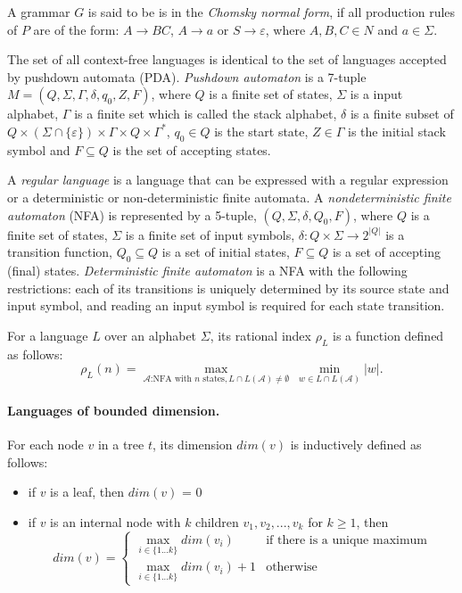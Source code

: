 \documentclass[11pt,a4paper]{article} %
\begin{document}
A grammar $G$ is said to be is in the \textit{Chomsky normal form}, if all production rules of $P$ are of the form:
$A \rightarrow BC$, $A \rightarrow a$ or $S \rightarrow \varepsilon$, where $A, B, C \in N$ and $a \in \Sigma$. 


The set of all context-free languages is identical to the set of languages accepted by pushdown automata (PDA). \textit{Pushdown automaton} is a 7-tuple $M = (Q, \Sigma, \Gamma, \delta, q_0, Z, F)$, where $Q$ is a finite set of states, $\Sigma$ is a input alphabet, $\Gamma$ is a finite set which is called the stack alphabet, $\delta$ is a finite subset of $Q \times (\Sigma \cap \{\varepsilon\}) \times \Gamma \times Q \times \Gamma^*$,
$q_{0}\in Q$ is the start state, $Z \in \Gamma$ is the initial stack symbol and
$F\subseteq Q$ is the set of accepting states.


A \textit{regular language} is a language that can be expressed with a regular expression or a deterministic or non-deterministic finite automata.
A \textit{nondeterministic finite automaton} (NFA) is represented by a 5-tuple, $(Q,\Sigma ,\delta ,Q_{0},F)$, where $Q$ is a finite set of states, $\Sigma$ is a finite set of input symbols, $\delta:Q\times \Sigma \rightarrow 2^{|Q|}$ is a transition function, $Q_0 \subseteq Q$ is a set of initial states, $F \subseteq Q$ is a set of accepting (final) states. \textit{Deterministic finite automaton} is a NFA with the following restrictions: each of its transitions is uniquely determined by its source state and input symbol, and reading an input symbol is required for each state transition.


 For a language $L$ over an alphabet $\Sigma$, its rational index $\rho_L$ is a function defined as follows:
$$\rho_L(n) = \max_{\mathcal{A} \text{:NFA with }n\text{ states}, L \cap L(\mathcal{A}) \neq \emptyset}\ \min_{w \in  L \cap L(\mathcal{A})}|w|.$$ 

\paragraph{Languages of bounded dimension.} 
For each node $v$ in a tree $t$, its dimension $dim(v)$ is inductively defined as follows:
\begin{itemize}
\item if $v$ is a leaf, then $dim(v)$ = 0
\item if $v$ is an internal node with $k$ children $v_1, v_2, ..., v_k$ for $k \ge 1$, then 
$$
dim(v) = 
 \begin{cases}
   \max_{i \in \{1...k\}}dim(v_i) &\text{if there is a unique maximum}\\
   \max_{i \in \{1...k\}}dim(v_i)+1 &\text{otherwise}
 \end{cases}
$$
\end{itemize}
\end{document}
